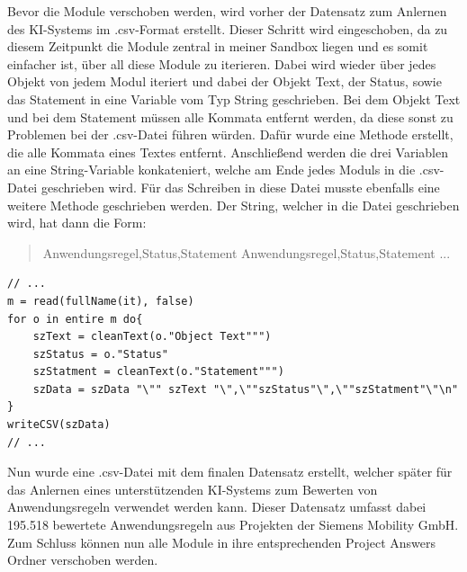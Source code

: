 Bevor die Module verschoben werden, wird vorher der Datensatz zum Anlernen des KI-Systems im .csv-Format erstellt. Dieser
Schritt wird eingeschoben, da zu diesem Zeitpunkt die Module zentral in meiner Sandbox liegen und es somit einfacher ist, über all diese Module zu iterieren. Dabei wird wieder über jedes Objekt
von jedem Modul iteriert und dabei der Objekt Text, der Status, sowie das Statement in eine Variable vom Typ String geschrieben. Bei dem Objekt Text und bei dem Statement müssen alle Kommata entfernt
werden, da diese sonst zu Problemen bei der .csv-Datei führen würden. Dafür wurde eine Methode erstellt, die alle Kommata eines Textes entfernt. Anschließend werden die drei Variablen an eine
String-Variable konkateniert, welche am Ende jedes Moduls in die .csv-Datei geschrieben wird. Für das Schreiben in diese Datei musste ebenfalls eine weitere Methode geschrieben werden. 
Der String, welcher in die Datei geschrieben wird, hat dann die Form:

\begin{quotation}
    \noindent
    \dq Anwendungsregel\dq,\dq Status\dq,\dq Statement\dq \linebreak
    \dq Anwendungsregel\dq,\dq Status\dq,\dq Statement\dq \linebreak
    ...
\end{quotation}

\begin{lstlisting}[caption={Daten in eine .csv-Datei schreiben}, captionpos=b, label = lst:writeCSV]
// ...
m = read(fullName(it), false)
for o in entire m do{
    szText = cleanText(o."Object Text""")
    szStatus = o."Status"
    szStatment = cleanText(o."Statement""")
    szData = szData "\"" szText "\",\""szStatus"\",\""szStatment"\"\n"
}
writeCSV(szData)
// ...
\end{lstlisting}

Nun wurde eine .csv-Datei mit dem finalen Datensatz erstellt, welcher später für das Anlernen eines unterstützenden KI-Systems zum Bewerten von Anwendungsregeln verwendet werden kann.
Dieser Datensatz umfasst dabei 195.518 bewertete Anwendungsregeln aus Projekten der Siemens Mobility GmbH. Zum Schluss können nun alle Module in ihre entsprechenden Project Answers Ordner 
verschoben werden. 
